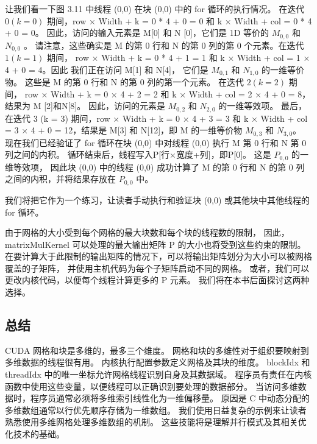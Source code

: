 让我们看一下图 3.11 中线程 (0,0) 在块 (0,0) 中的 for 循环的执行情况。 
在迭代 $0(k = 0)$ 期间，row × Width + k = 0 * 4 + 0 = 0 和 k × Width + col = 0 * 4 + 0 = 0。
因此，访问的输入元素是 M[0] 和 N [0]，它们是 1D 等价的 $M_{0,0}$ 和 $N_{0,0}$ 。 
请注意，这些确实是 M 的第 0 行和 N 的第 0 列的第 0 个元素。在迭代 $1(k = 1)$ 期间，
row × Width + k = 0 * 4 + 1 = 1 和 k × Width + col = 1 × 4 + 0 = 4。因此 我们正在访问 M[1] 和 N[4]，
它们是 $M_{0,1}$ 和 $N_{1,0}$ 的一维等价物。 这些是 M 的第 0 行和 N 的第 0 列的第一个元素。
在迭代 $2(k = 2)$ 期间， row × Width + k = 0 × 4 + 2 = 2 和 k × Width + col = 2 × 4 + 0 = 8，
结果为 M [2]和N[8]。 因此，访问的元素是 $M_{0,2}$ 和 $N_{2,0}$ 的一维等效项。
最后，在迭代 3 (k = 3) 期间，row × Width + k = 0 × 4 + 3 = 3 
和 k × Width + col = 3 × 4 + 0 = 12，结果是 M[3] 和 N[12]，即 M 的一维等价物 $M_{0,3}$ 和 $N_{3,0}$。 
现在我们已经验证了 for 循环在块 (0,0) 中对线程 (0,0) 执行 M 第 0 行和 N 第 0 列之间的内积。 
循环结束后，线程写入P[行×宽度+列]，即P[0]。 这是 $P_{0,0}$ 的一维等效项，
因此块 (0,0) 中的线程 (0,0) 成功计算了 M 的第 0 行和 N 的第 0 列之间的内积，并将结果存放在 $P_{0,0}$ 中。

我们将把它作为一个练习，让读者手动执行和验证块 (0,0) 或其他块中其他线程的 for 循环。

由于网格的大小受到每个网格的最大块数和每个块的线程数的限制，
因此，matrixMulKernel 可以处理的最大输出矩阵 P 的大小也将受到这些约束的限制。 
在要计算大于此限制的输出矩阵的情况下，可以将输出矩阵划分为大小可以被网格覆盖的子矩阵，
并使用主机代码为每个子矩阵启动不同的网格。 或者，我们可以更改内核代码，以便每个线程计算更多的 P 元素。 
我们将在本书后面探讨这两种选择。

\subsection{总结}
CUDA 网格和块是多维的，最多三个维度。 网格和块的多维性对于组织要映射到多维数据的线程很有用。 
内核执行配置参数定义网格及其块的维度。 blockIdx 和 threadIdx 中的唯一坐标允许网格线程识别自身及其数据域。 
程序员有责任在内核函数中使用这些变量，以便线程可以正确识别要处理的数据部分。 
当访问多维数据时，程序员通常必须将多维索引线性化为一维偏移量。 
原因是 C 中动态分配的多维数组通常以行优先顺序存储为一维数组。 
我们使用日益复杂的示例来让读者熟悉使用多维网格处理多维数组的机制。 这些技能将是理解并行模式及其相关优化技术的基础。